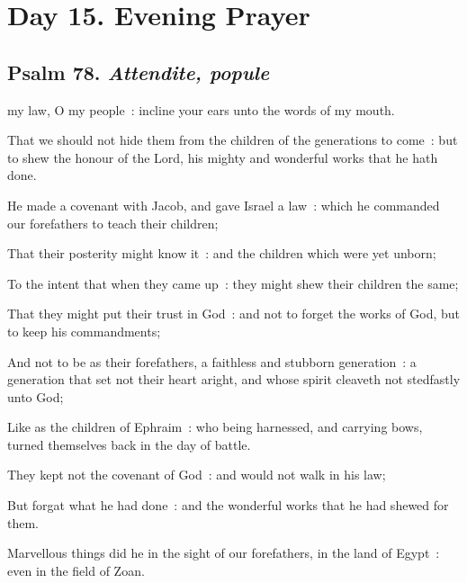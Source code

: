 \section*{Day 15. Evening Prayer}

\subsection{Psalm 78. \textit{Attendite, popule}}


 my law, O my people~: incline your ears unto the words of my mouth.\par
{}
That we should not hide them from the children of the generations to come~: but to shew the honour of the Lord, his mighty and wonderful works that he hath done.\par
{}He made a covenant with Jacob, and gave Israel a law~: which he commanded our forefathers to teach their children;\par
{}That their posterity might know it~: and the children which were yet unborn;\par
{}To the intent that when they came up~: they might shew their children the same;\par
{}That they might put their trust in God~: and not to forget the works of God, but to keep his commandments;\par
{}And not to be as their forefathers, a faithless and stubborn generation~: a generation that set not their heart aright, and whose spirit cleaveth not stedfastly unto God;\par
{}Like as the children of Ephraim~: who being harnessed, and carrying bows, turned themselves back in the day of battle.\par
{}They kept not the covenant of God~: and would not walk in his law;\par
{}But forgat what he had done~: and the wonderful works that he had shewed for them.\par
{}Marvellous things did he in the sight of our forefathers, in the land of Egypt~: even in the field of Zoan.\par
